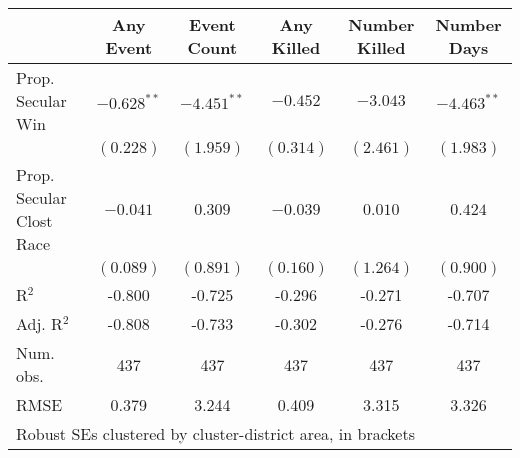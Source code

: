 
\begin{tabular}{l c c c c c }
\hline
 & Any Event & Event Count & Any Killed & Number Killed & Number Days \\
\hline
Prop. Secular Win        & $-0.628^{**}$ & $-4.451^{**}$ & $-0.452$  & $-3.043$  & $-4.463^{**}$ \\
                         & $(0.228)$     & $(1.959)$     & $(0.314)$ & $(2.461)$ & $(1.983)$     \\
Prop. Secular Clost Race & $-0.041$      & $0.309$       & $-0.039$  & $0.010$   & $0.424$       \\
                         & $(0.089)$     & $(0.891)$     & $(0.160)$ & $(1.264)$ & $(0.900)$     \\
\hline
R$^2$                    & -0.800        & -0.725        & -0.296    & -0.271    & -0.707        \\
Adj. R$^2$               & -0.808        & -0.733        & -0.302    & -0.276    & -0.714        \\
Num. obs.                & 437           & 437           & 437       & 437       & 437           \\
RMSE                     & 0.379         & 3.244         & 0.409     & 3.315     & 3.326         \\
\hline
\multicolumn{6}{l}{\scriptsize{Robust SEs clustered by cluster-district area, in brackets}}
\end{tabular}
